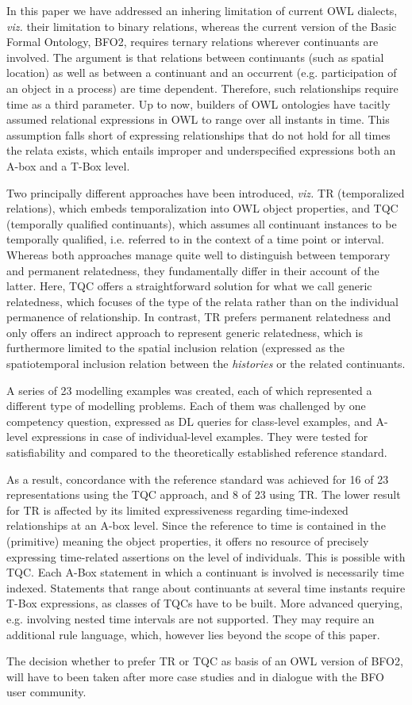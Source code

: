 
In this paper we have addressed an inhering limitation of current OWL dialects,
\emph{viz.} their limitation to binary relations, whereas the current version 
of the Basic Formal Ontology, BFO2, requires ternary relations wherever
continuants are involved. The argument is that relations between continuants 
(such as spatial location) as well as between a continuant and an occurrent 
(e.g. participation of an object in a process) are time dependent. Therefore, 
such relationships require time as a third parameter. 
Up to now, builders of OWL ontologies have tacitly assumed relational expressions
in OWL to range over all instants in time. This assumption falls short of 
expressing relationships that do not hold for all times the relata exists, 
which entails improper and underspecified expressions both an A-box and 
a T-Box level. 

Two principally different approaches have been introduced, \emph{viz.} TR 
(temporalized relations), which embeds temporalization into OWL object properties, 
and TQC (temporally qualified continuants), which assumes all continuant instances
to be temporally qualified, i.e. referred to in the context of a time point or 
interval. Whereas both approaches manage quite well to distinguish between 
temporary and permanent relatedness, they fundamentally differ in their account 
of the latter. Here, TQC offers a straightforward solution for what we call 
generic relatedness, which focuses of the type of the relata rather than on 
the individual permanence of relationship. In contrast, TR prefers 
permanent relatedness and only offers an indirect approach to represent 
generic relatedness, which is furthermore limited to the spatial inclusion 
relation (expressed as the spatiotemporal inclusion relation between the 
\emph{histories} or the related continuants.

A series of 23 modelling examples was created, each of which represented a different
type of modelling problems. Each of them was challenged by one competency question, 
expressed as DL queries for class-level examples, and A-level expressions in case
of individual-level examples. They were tested for satisfiability and compared
to the theoretically established reference standard. 

As a result, concordance with the reference standard was achieved for 16 of 23 
representations using the TQC approach, and 8 of 23 using TR. The lower result for 
TR is affected by its limited expressiveness regarding time-indexed relationships
at an A-box level. Since the reference to time is contained in the (primitive)
meaning the object properties, it offers no resource of precisely expressing 
time-related assertions on the level of individuals. 
This is possible with TQC. Each A-Box statement in which a continuant 
is involved is necessarily time indexed. Statements that range about continuants
at several time instants require T-Box expressions, as classes of TQCs have to be built.
More advanced querying, e.g. involving nested time intervals are not supported.
They may require an additional rule language, which, however lies beyond the scope
of this paper. 

The decision whether to prefer TR or TQC as basis of an OWL version of BFO2, will 
have to been taken after more case studies and in dialogue with the BFO user community. 










   

